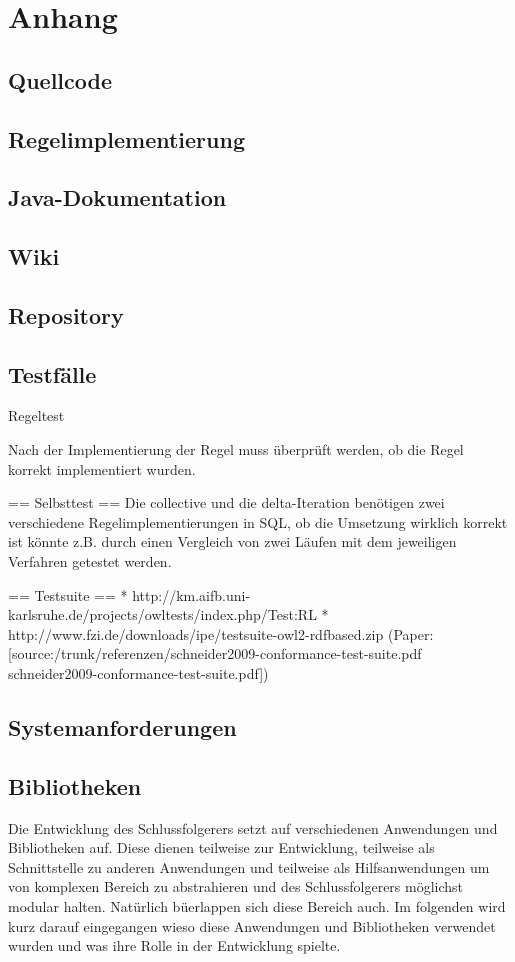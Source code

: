 \chapter{Anhang}
\section*{Quellcode}
\section*{Regelimplementierung}
\section*{Java-Dokumentation}
\section*{Wiki}
\section*{Repository}
\section*{Testfälle}
Regeltest

Nach der Implementierung der Regel muss überprüft werden, ob die Regel korrekt implementiert wurden.

== Selbsttest ==
Die collective und die delta-Iteration benötigen zwei verschiedene Regelimplementierungen in SQL, ob die Umsetzung wirklich korrekt ist könnte z.B. durch einen Vergleich von zwei Läufen mit dem jeweiligen Verfahren getestet werden.

== Testsuite ==
 * http://km.aifb.uni-karlsruhe.de/projects/owltests/index.php/Test:RL
 * http://www.fzi.de/downloads/ipe/testsuite-owl2-rdfbased.zip (Paper: [source:/trunk/referenzen/schneider2009-conformance-test-suite.pdf schneider2009-conformance-test-suite.pdf])
 
\section*{Systemanforderungen}
\section*{Bibliotheken}
Die Entwicklung des Schlussfolgerers setzt auf verschiedenen Anwendungen und Bibliotheken auf. Diese dienen teilweise zur Entwicklung, teilweise als Schnittstelle zu anderen Anwendungen und teilweise als Hilfsanwendungen um von komplexen Bereich zu abstrahieren und des Schlussfolgerers möglichst modular halten. Natürlich büerlappen sich diese Bereich auch. Im folgenden wird kurz darauf eingegangen wieso diese Anwendungen und Bibliotheken verwendet wurden und was ihre Rolle in der Entwicklung spielte.

